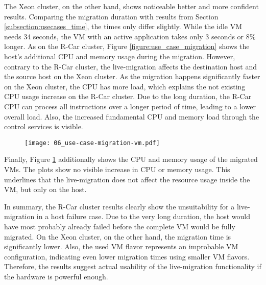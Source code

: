            \noindent The Xeon cluster, on the other hand, shows noticeable better and more confident results.
            Comparing the migration duration with results from Section \ref{subsection:usecases_time}, the times only differ slightly.
            While the idle \ac{VM} needs 34 seconds, the \ac{VM} with an active application takes only 3 seconds or 8\% longer.
            As on the R-Car cluster, Figure \ref{figure:use_case_migration} shows the host's additional \ac{CPU} and memory usage during the migration.
            However, contrary to the R-Car cluster, the live-migration affects the destination host and the source host on the Xeon cluster.
            As the migration happens significantly faster on the Xeon cluster, the \ac{CPU} has more load, which explains the not existing \ac{CPU} usage increase on the R-Car cluster.
            Due to the long duration, the R-Car \ac{CPU} can process all instructions over a longer period of time, leading to a lower overall load.
            Also, the increased fundamental \ac{CPU} and memory load through the control services is visible.
            
            \begin{figure}[H]
              \centering
              \texttt{[image: 06\_use-case-migration-vm.pdf]}
              \label{fig:use_case_migration_vm}
            \end{figure}
            
            \noindent Finally, Figure \ref{fig:use_case_migration_vm} additionally shows the \ac{CPU} and memory usage of the migrated \acp{VM}.
            The plots show no visible increase in \ac{CPU} or memory usage.
            This underlines that the live-migration does not affect the resource usage inside the \ac{VM}, but only on the host.
            
            \noindent In summary, the R-Car cluster results clearly show the unsuitability for a live- migration in a host failure case.
            Due to the very long duration, the host would have most probably already failed before the complete \ac{VM} would be fully migrated.
            On the Xeon cluster, on the other hand, the migration time is significantly lower.
            Also, the used \ac{VM} flavor represents an improbable \ac{VM} configuration, indicating even lower migration times using smaller \ac{VM} flavors.
            Therefore, the results suggest actual usability of the live-migration functionality if the hardware is powerful enough.
            
